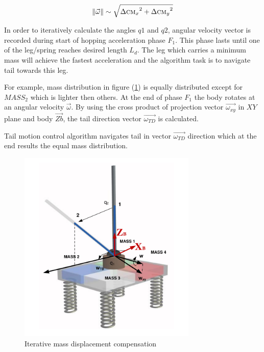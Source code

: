 \begin{equation}
\left \| \vec{\omega} \right \|\sim \sqrt{{\Delta \textsc{cm}_x}^2+{\Delta \textsc{cm}_y}^2}
\end{equation}


In order to iteratively calculate the angles $q1$ and $q2$, angular velocity vector is recorded during start of hopping acceleration phase $F_1$. This phase lasts until one of the leg/spring reaches desired length $L_d$. The leg which carries a minimum mass will achieve the fastest acceleration and the algorithm task is to navigate tail towards this leg. 

For example, mass distribution in figure  (\ref{fig:imassCom}) is equally distributed except for $MASS_2$  which is lighter then others. At the end of phase $F_1$ the body rotates at an angular velocity $\vec{\omega}$. By using the cross product of projection vector $\vec{\omega_{xy}}$ in $XY$ plane and body $\vec{Zb}$, the tail direction vector $\vec{\omega_{TD}}$ is calculated. 

Tail motion control algorithm navigates tail in vector $\vec{\omega_{TD}}$ direction which at the end results the equal mass distribution.

\begin{figure}
	\centering
	\includegraphics[width=85mm]{./pictures/IterativeAlgorithm.pdf}
	\caption{Iterative mass displacement compensation}
	\label{fig:imassCom}
\end{figure}





